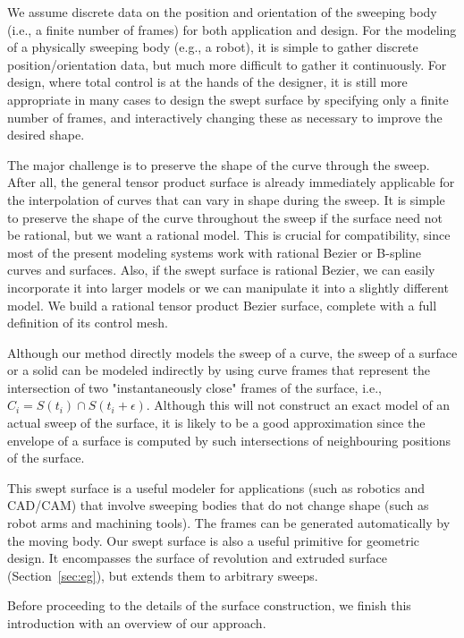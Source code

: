 We assume discrete data on the position and orientation
of the sweeping body (i.e., a finite number of frames)
for both application and design.
For the modeling of a
physically sweeping body (e.g., a robot), it is simple to gather
discrete position/orientation data, but much more difficult
to gather it continuously.
For design, where total control is at the hands of the designer,
it is still more appropriate in many cases to design the swept surface
by specifying only a finite number of frames,
and interactively changing these as necessary to improve the
desired shape.

The major challenge is to preserve the shape of the curve through the sweep.
After all, the general tensor product surface is already immediately
applicable for the interpolation of curves that can vary in shape 
during the sweep.
It is simple to preserve the shape of the curve throughout the sweep
if the surface need not be rational, but we want a rational model.
This is crucial for compatibility, 
since most of the present modeling systems work with rational Bezier or
B-spline curves and surfaces.
Also, if the swept surface is rational Bezier, 
we can easily incorporate it into larger models
or we can manipulate it into a slightly different model.
We build a rational tensor product Bezier surface, complete with a full
definition of its control mesh.

Although our method directly models the sweep of a curve,
the sweep of a surface or a solid can be modeled indirectly
by using curve frames that represent the intersection of two 
"instantaneously close" frames of the surface,
i.e., $C_i = S(t_i) \cap S(t_i+\epsilon)$.
Although this will not construct an 
exact model of an actual sweep of the surface,
it is likely to be a good approximation since the 
envelope of a surface is computed by such intersections
of neighbouring positions of the surface.

This swept surface is a useful modeler for applications (such as
robotics and CAD/CAM) that involve sweeping bodies that do not change shape 
(such as robot arms and machining tools).
The frames can be generated automatically by the moving body.
Our swept surface is also a useful primitive for geometric design.
It encompasses the surface of revolution and extruded surface
(Section~\ref{sec:eg}), but extends them to arbitrary sweeps.

Before proceeding to the details of the surface construction, we
finish this introduction with an overview of our approach.

